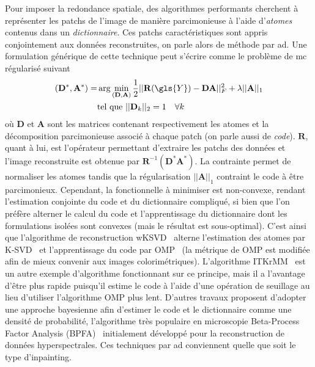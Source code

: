 Pour imposer la redondance spatiale, des algorithmes performants cherchent à représenter les patchs de l'image de manière parcimonieuse à l'aide d'\emph{atomes} contenus dans un \emph{dictionnaire}. Ces patchs caractéristiques sont appris conjointement aux données reconstruites, on parle alors de méthode par \gls{ad}. Une formulation générique de cette technique peut s'écrire comme le problème de \gls{mc} régularisé suivant~\cite{mairal2009online}
\begin{equation}
    \begin{aligned}
    (\mathbf{D}^*,\mathbf{A}^*) = &\arg\min_{(\mathbf{D}, \mathbf{A})}
    \frac{1}{2} || \mathbf{R}(\gls{Y}) - \mathbf{D A}||_F^2 + \lambda  || \mathbf{A} ||_1\\
    &\text{tel que } || \mathbf{D}_k ||_2 = 1 \quad \forall k\\
    \end{aligned}
\end{equation}
où $\mathbf{D}$ et $\mathbf{A}$ sont les matrices contenant respectivement les atomes et la décomposition parcimonieuse associé à chaque patch (on parle aussi de \emph{code}). $\mathbf{R}$, quant à lui, est l'opérateur permettant d'extraire les patchs des données et l'image reconstruite est obtenue par $\mathbf{R}^{-1}(\mathbf{D}^*\mathbf{A}^*)$. La contrainte permet de normaliser les atomes tandis que la régularisation $|| \mathbf{A} ||_1$ contraint le code à être parcimonieux. %
%
Cependant, la fonctionnelle à minimiser est non-convexe, rendant l'estimation conjointe du code et du dictionnaire compliqué, si bien que l'on préfère alterner le calcul du code et l'apprentissage du dictionnaire dont les formulations isolées sont convexes (mais le résultat est sous-optimal). C'est ainsi que l'algorithme de reconstruction wKSVD~\cite{mairal2008tip} alterne l'estimation des atomes par K-SVD~\cite{aharon2006k} et l'apprentissage du code par OMP~\cite{mallat1993matching, pati1993orthogonal} (la métrique de OMP est modifiée afin de mieux convenir aux images colorimétriques). L'algorithme ITKrMM~\cite{naumova2018fast, naumova2017dictionary} est un autre exemple d'algorithme fonctionnant sur ce principe, mais il a l'avantage d'être plus rapide puisqu'il estime le code à l'aide d'une opération de seuillage au lieu d'utiliser l'algorithme OMP plus lent. %
%
{\color{red}D'autres travaux proposent d'adopter une approche bayesienne afin d'estimer le code et le dictionnaire comme une densité de probabilité, l'algorithme très populaire en microscopie Beta-Process Factor Analysis (BPFA)~\cite{xing2012siam} initialement développé pour la reconstruction de données hyperspectrales. Ces techniques par \gls{ad} conviennent quelle que soit le type d'inpainting.}

